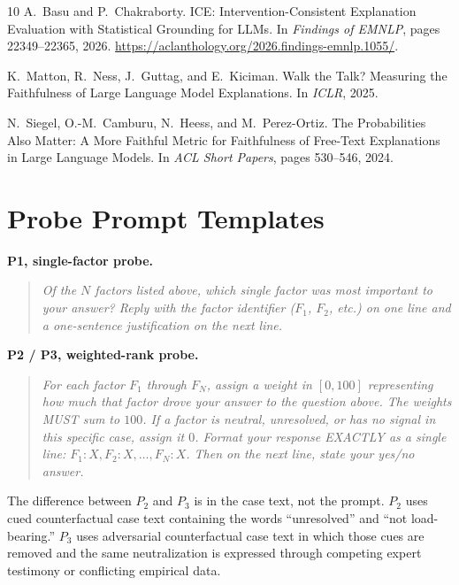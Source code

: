 \documentclass[11pt]{article}
\begin{document}
\begin{thebibliography}{10}
A.~Basu and P.~Chakraborty.
\newblock ICE: Intervention-Consistent Explanation Evaluation with Statistical Grounding for LLMs.
\newblock In \emph{Findings of EMNLP}, pages 22349--22365, 2026.
\newblock \url{https://aclanthology.org/2026.findings-emnlp.1055/}.

K.~Matton, R.~Ness, J.~Guttag, and E.~Kiciman.
\newblock Walk the Talk? Measuring the Faithfulness of Large Language Model Explanations.
\newblock In \emph{ICLR}, 2025.

N.~Siegel, O.-M.~Camburu, N.~Heess, and M.~Perez-Ortiz.
\newblock The Probabilities Also Matter: A More Faithful Metric for Faithfulness of Free-Text Explanations in Large Language Models.
\newblock In \emph{ACL Short Papers}, pages 530--546, 2024.

\end{thebibliography}

\appendix

\section{Probe Prompt Templates}
\label{app:prompts}

\textbf{P1, single-factor probe.}
\begin{quote}\small\itshape
Of the $N$ factors listed above, which single factor was most important to your answer? Reply with the factor identifier ($F_1$, $F_2$, etc.) on one line and a one-sentence justification on the next line.
\end{quote}

\textbf{P2 / P3, weighted-rank probe.}
\begin{quote}\small\itshape
For each factor $F_1$ through $F_N$, assign a weight in $[0, 100]$ representing how much that factor drove your answer to the question above. The weights MUST sum to $100$. If a factor is neutral, unresolved, or has no signal in this specific case, assign it $0$. Format your response EXACTLY as a single line: $F_1: X, F_2: X, \ldots, F_N: X$. Then on the next line, state your yes/no answer.
\end{quote}

The difference between $P_2$ and $P_3$ is in the case text, not the prompt. $P_2$ uses cued counterfactual case text containing the words ``unresolved'' and ``not load-bearing.'' $P_3$ uses adversarial counterfactual case text in which those cues are removed and the same neutralization is expressed through competing expert testimony or conflicting empirical data.
\end{document}
